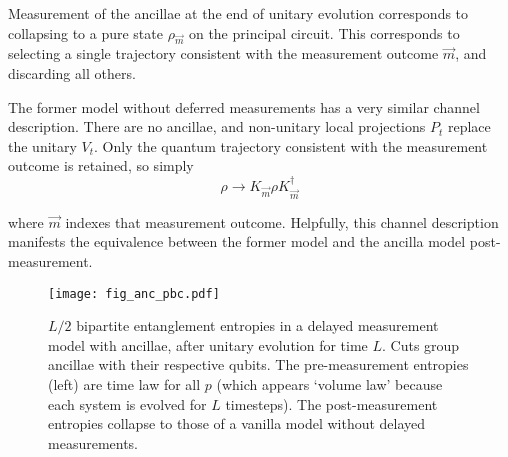 \documentclass[10pt]{article}
\begin{document}
Measurement of the ancillae at the end of unitary evolution corresponds to collapsing to a pure state $\rho_{\vec{m}}$ on the principal circuit. This corresponds to selecting a single trajectory consistent with the measurement outcome $\vec{m}$, and discarding all others. 


The former model without deferred measurements has a very similar channel description. There are no ancillae, and non-unitary local projections $P_t$ replace the unitary $V_t$. Only the quantum trajectory consistent with the measurement outcome is retained, so simply
\begin{equation}
\rho \rightarrow K_{\vec{m}} \rho K_{\vec{m}}^\dagger
\end{equation}

where $\vec{m}$ indexes that measurement outcome. Helpfully, this channel description manifests the equivalence between the former model and the ancilla model post-measurement.



\begin{figure}[t]
\centering
\texttt{[image: fig\_anc\_pbc.pdf]}
\caption{$L/2$ bipartite entanglement entropies in a delayed measurement model with ancillae, after unitary evolution for time $L$. Cuts group ancillae with their respective qubits. The pre-measurement entropies (left) are time law for all $p$ (which appears `volume law' because each system is evolved for $L$ timesteps). The post-measurement entropies collapse to those of a vanilla model without delayed measurements.}
\label{fig_anc_pbc}
\end{figure}
\end{document}
